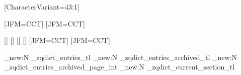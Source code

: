 \usepackage{hyperref}

\usepackage[disablejfam]{luatexja}
\usepackage{luatexja-fontspec}
\usepackage{luatexja-ruby}

\usepackage{expl3}
\usepackage{adjustbox}
\usepackage{calc}
\usepackage{fancyhdr}
\usepackage{ifthen}
\usepackage{multicol}
\usepackage{pdfcomment}
\usepackage{pxpic}
\usepackage{enumitem}
\usepackage{titlesec}
\usepackage{xparse}

\usepackage{geometry}

\setmainfont{Junicode}
\setfontface{}[CharacterVariant={43:1}]
\setfontface{}

[JFM=CCT]
[JFM=CCT]




\newjfontfamily{}[]
\newjfontfamily{}[]
\newjfontfamily{}[]
\newjfontfamily{}[]
\newjfontfamily{}[JFM=CCT]
\newjfontfamily{}[JFM=CCT]

\newcommand{\textJapn}[1]{{%
    \fontMainJapn%
    #1%
  }}
\newcommand{\textKor}[1]{{%
    \fontMainKo
    #1%
  }}
\newcommand{\textHant}[1]{{%
    \fontMainHans%
    #1%
  }}
\newcommand{\textHans}[1]{{%
    \fontMainHans%
    #1%
  }}


\newlength{\EntryDescriptionLineLength}
\newlength{\EntryDescriptionLineHeight}
\newlength{\EntryDescriptionLineIndent}

\providecommand\phantomsection{}

\geometry{top=10mm,headheight=18pt,headsep=2pt,inner=20mm,outer=10mm,textheight=55em}

\ExplSyntaxOn

\tl_new:N \g_zqdict_entries_tl
\tl_new:N \g_zqdict_entries_archived_tl
\int_new:N \g_zqdict_entries_archived_page_int
\tl_new:N \g_zqdict_current_section_tl


